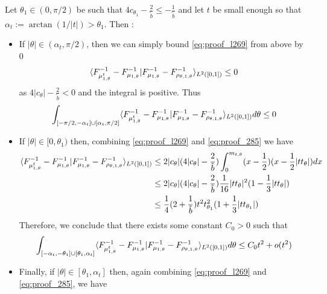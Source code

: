     Let $\theta_1 \in (0,\pi/2)$ be such that $4c_{\theta_1} - \frac{2}{\tilde{b}} \leq -\frac{1}{\tilde{b}}$ and let $t$ be small enough so that $\alpha_t := \arctan(1/|t|) > \theta_1$. Then :
    \begin{itemize}
        \item If $|\theta| \in (\alpha_t,\pi/2)$, then we can simply bound \eqref{eq:proof_l269} from above by 0
        \begin{equation} \langle F^{-1}_{\mu^t_{1,\theta}} - F^{-1}_{\mu_{1,\theta}}|F^{-1}_{\mu_{1,\theta}} - F^{-1}_{\rho_{\theta,1,\theta}}\rangle_{L^2([0,1])} 
        \leq 0 \end{equation}
         as $4|c_{\theta}| - \frac{2}{\tilde{b}} < 0$ and the integral is positive. Thus
        \begin{equation}
            \label{eq:proof_l294} \int_{[-\pi/2,-\alpha_t] \cup [\alpha_t,\pi/2]}\langle F^{-1}_{\mu^t_{1,\theta}} - F^{-1}_{\mu_{1,\theta}}|F^{-1}_{\mu_{1,\theta}} - F^{-1}_{\rho_{\theta,1,\theta}}\rangle_{L^2([0,1])} d\theta
        \leq 0 
        \end{equation}
         \item If $|\theta| \in [0,\theta_1)$ then, combining \eqref{eq:proof_l269} and \eqref{eq:proof_285} we have
         \begin{align}
            \langle F^{-1}_{\mu^t_{1,\theta}} - F^{-1}_{\mu_{1,\theta}}|F^{-1}_{\mu_{1,\theta}} - F^{-1}_{\rho_{\theta,1,\theta}}\rangle_{L^2([0,1])} 
            &\leq 2|c_\theta|(4|c_\theta|-\frac{2}{\tilde{b}}) \int_0^{m_{t,\theta}} (x - \frac{1}{2})(x - \frac{1}{2}|tt_\theta|) dx \\
            &\leq 2|c_\theta|(4|c_\theta|-\frac{2}{\tilde{b}}) \frac{1}{16}|tt_\theta|^2(1 - \frac{1}{3}|tt_\theta|) \\
            &\leq \frac{1}{4} (2 + \frac{1}{\tilde{b}}) t^2 t_{\theta_1}^2 (1 + \frac{1}{3} |tt_{\theta_1}|)
        \end{align}
        Therefore, we conclude that there exists some constant $C_0 > 0$ such that 
        \begin{equation}
            \label{eq:proof_l304} \int_{[-\alpha_t,-\theta_1] \cup [\theta_1,\alpha_t]}\langle F^{-1}_{\mu^t_{1,\theta}} - F^{-1}_{\mu_{1,\theta}}|F^{-1}_{\mu_{1,\theta}} - F^{-1}_{\rho_{\theta,1,\theta}}\rangle_{L^2([0,1])} d\theta \leq C_0 t^2 + o(t^2) 
        \end{equation}
        \item Finally, if $|\theta| \in [\theta_1, \alpha_t]$ then, again combining \eqref{eq:proof_l269} and \eqref{eq:proof_285}, we have

\end{itemize}
